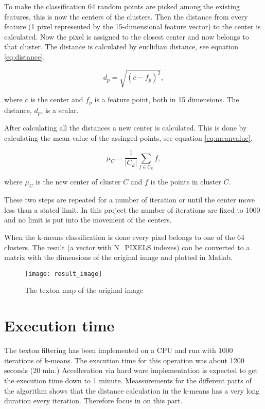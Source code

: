 To make the classification 64 random points are picked among the existing features, this is now the centers of the clusters. 
Then the distance from every feature (1 pixel represented by the 15-dimensional feature vector) to the center is calculated. 
Now the pixel is assigned to the closest center and now belongs to that cluster. 
The distance is calculated by euclidian distance, see equation \ref{eq:distance}.

\begin{equation}
\label{eq:distance}
d_p = \sqrt{(c-f_p)^2},
\end{equation}

where $c$ is the center and $f_p$ is a feature point, both in 15 dimensions. The distance, $d_p$, is a scalar.

After calculating all the distances a new center is calculated. 
This is done by calculating the mean value of the assinged points, see equation \ref{eq:meanvalue}.

\begin{equation}
\label{eq:meanvalue}
\mu_C = \frac{1}{|C_k|}\sum_{f\in C_k}f,
\end{equation}

where $\mu_C$ is the new center of cluster $C$ and $f$ is the points in cluster $C$.

These two steps are repeated for a number of iteration or until the center move less than a stated limit. 
In this project the number of iterations are fixed to 1000 and no limit is put into the movement of the centers.

When the k-means classification is done every pixel belongs to one of the 64 clusters. 
The result (a vector with N\_PIXELS indexes) can be 
converted to a matrix with the dimensions of the 
original image and plotted in Matlab.

\begin{figure}[H]
\centering
\texttt{[image: result\_image]}
\caption{The texton map of the original image}
\label{fig:result}
\end{figure}



\section{Execution time}
The texton filtering has been implemented on a CPU and run with 1000 iterations of k-means. 
The execution time for this operation was about 1200 seconds (20 min.) 
Accelleration via hard ware implementation is expected to get the execution time down to 1 minute. 
Meassurements for the different parts of the algorithm shows that the distance calculation in the k-means has a very long duration every iteration. 
Therefore focus in on this part.

